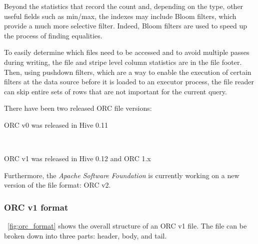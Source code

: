 \documentclass[10pt, a4paper]{report}
\begin{document}
Beyond the statistics that record the count and, depending on the type, other useful fields such as min/max, the indexes may include Bloom filters, which provide a much more selective filter. Indeed, Bloom filters are used to speed up the process of finding equalities.

To easily determine which files need to be accessed and to avoid multiple passes during writing, the file and stripe level column statistics are in the file footer. Then, using pushdown filters, which are a way to enable the execution of certain filters at the data source before it is loaded to an executor process, the file reader can skip entire sets of rows that are not important for the current query\cite{orc_format}.

There have been two released ORC file versions: \\
\begin{itemize}
	\begin{minipage}{0.92\textwidth}
		\item ORC v0 was released in Hive 0.11 \\
	\end{minipage} \\
	\begin{minipage}{0.92\textwidth}
		\item ORC v1 was released in Hive 0.12 and ORC 1.x \\
	\end{minipage}
\end{itemize}
Furthermore, the \textit{Apache Software Foundation} is currently working on a new version of the file format: ORC v2\cite{orc_specification}.

\subsubsection{ORC v1 format}

\figurename~\ref{fig:orc_format} shows the overall structure of an ORC v1 file. The file can be broken down into three parts: header, body, and tail.
\end{document}
